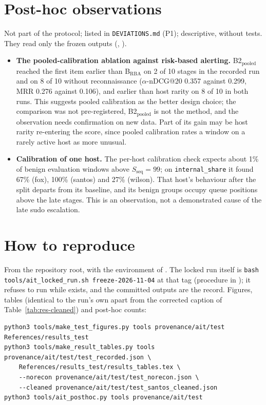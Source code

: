 \documentclass[10pt,a4paper]{article}
\begin{document}
\section{Post-hoc observations}
\label{sec:posthoc}
Not part of the protocol; listed in \texttt{DEVIATIONS.md} (P1); descriptive, without tests. They read only the frozen outputs (, ).
\begin{itemize}
\item \textbf{The pooled-calibration ablation against risk-based alerting.} B2$_\mathrm{pooled}$ reached the first item earlier than B$_\mathrm{RBA}$ on 2 of 10 stages in the recorded run and on 8 of 10 without reconnaissance ($\alpha$-nDCG@20 0.357 against 0.299, MRR 0.276 against 0.106), and earlier than host rarity on 8 of 10 in both runs. This suggests pooled calibration as the better design choice; the comparison was not pre-registered, B2$_\mathrm{pooled}$ is not the method, and the observation needs confirmation on new data. Part of its gain may be host rarity re-entering the score, since pooled calibration rates a window on a rarely active host as more unusual.
\item \textbf{Calibration of one host.} The per-host calibration check expects about 1\% of benign evaluation windows above $S_\mathrm{seq} = 99$; on \texttt{internal\_share} it found 67\% (fox), 100\% (santos) and 27\% (wilson). That host's behaviour after the split departs from its baseline, and its benign groups occupy queue positions above the late stages. This is an observation, not a demonstrated cause of the late sudo escalation.
\end{itemize}

\section{How to reproduce}
\label{sec:repro}
From the repository root, with the environment of . The locked run itself is
\texttt{bash tools/ait\_locked\_run.sh freeze-2026-11-04} at that tag (procedure in );
it refuses to run while  exists, and the committed outputs are the record. Figures, tables
(identical to the run's own  apart from the corrected caption of Table~\ref{tab:res-cleaned})
and post-hoc counts:
{\small
\begin{verbatim}
python3 tools/make_test_figures.py tools provenance/ait/test References/results_test
python3 tools/make_result_tables.py tools provenance/ait/test/test_recorded.json \
    References/results_test/results_tables.tex \
    --norecon provenance/ait/test/test_norecon.json \
    --cleaned provenance/ait/test/test_santos_cleaned.json
python3 tools/ait_posthoc.py tools provenance/ait/test
\end{verbatim}}

\clearpage

\end{document}
